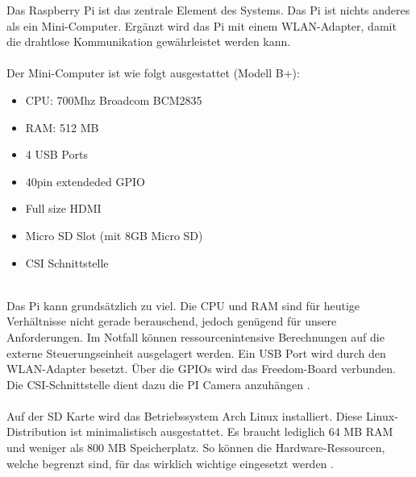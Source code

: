 Das Raspberry Pi ist das zentrale Element des Systems. Das Pi ist nichts anderes als ein Mini-Computer. Ergänzt wird das Pi mit einem WLAN-Adapter, damit die drahtlose Kommunikation gewährleistet werden kann. \\
\\
Der Mini-Computer ist wie folgt ausgestattet (Modell B+):
\begin{itemize}
	\item CPU: 700Mhz Broadcom BCM2835
	\item RAM: 512 MB
	\item 4 USB Ports
	\item 40pin extendeded GPIO
	\item Full size HDMI
	\item Micro SD Slot (mit 8GB Micro SD)
	\item CSI Schnittstelle
\end{itemize}
\\
Das Pi kann grundsätzlich zu viel. Die CPU und RAM sind für heutige Verhältnisse nicht gerade berauschend, jedoch genügend für unsere Anforderungen. Im Notfall können ressourcenintensive Berechnungen auf die externe Steuerungseinheit ausgelagert werden. Ein USB Port wird durch den WLAN-Adapter besetzt. Über die GPIOs wird das Freedom-Board verbunden. Die CSI-Schnittstelle dient dazu die PI Camera anzuhängen \cite{raspberri-b-plus-spec}.\\
\\
Auf der SD Karte wird das Betriebssystem Arch Linux installiert. Diese Linux-Distribution ist minimalistisch ausgestattet. Es braucht lediglich 64 MB RAM und weniger als 800 MB Speicherplatz. So können die Hardware-Ressourcen, welche begrenzt sind, für das wirklich wichtige eingesetzt werden \cite{arch-linux-system-requirements}.
